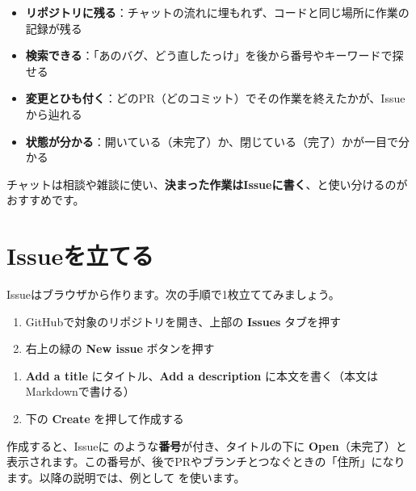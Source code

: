 \begin{itemize}[leftmargin=1.4em]
  \item \textbf{リポジトリに残る}：チャットの流れに埋もれず、コードと同じ場所に作業の記録が残る
  \item \textbf{検索できる}：「あのバグ、どう直したっけ」を後から番号やキーワードで探せる
  \item \textbf{変更とひも付く}：どのPR（どのコミット）でその作業を終えたかが、Issueから辿れる
  \item \textbf{状態が分かる}：開いている（未完了）か、閉じている（完了）かが一目で分かる
\end{itemize}

チャットは相談や雑談に使い、\textbf{決まった作業はIssueに書く}、と使い分けるのがおすすめです。

\section{Issueを立てる}

Issueはブラウザから作ります。次の手順で1枚立ててみましょう。

\begin{enumerate}[leftmargin=1.6em]
  \item GitHubで対象のリポジトリを開き、上部の \textbf{Issues} タブを押す
  \item 右上の緑の \textbf{New issue} ボタンを押す
\end{enumerate}

\begin{enumerate}[leftmargin=1.6em, start=3]
  \item \textbf{Add a title} にタイトル、\textbf{Add a description} に本文を書く（本文はMarkdownで書ける）
  \item 下の \textbf{Create} を押して作成する
\end{enumerate}

作成すると、Issueに  のような\textbf{番号}が付き、タイトルの下に \textbf{Open}（未完了）と表示されます。この番号が、後でPRやブランチとつなぐときの「住所」になります。以降の説明では、例として  を使います。


